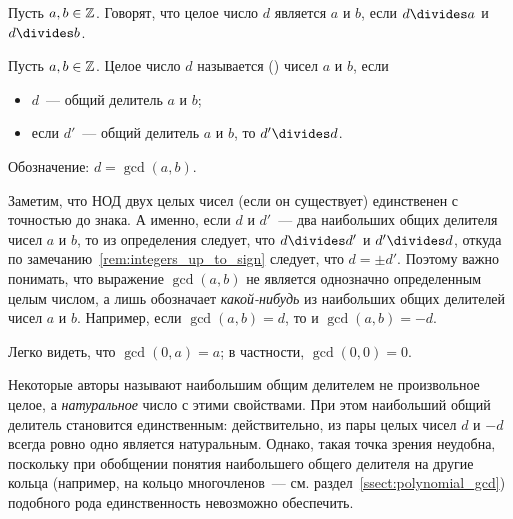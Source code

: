 
\begin{definition}
Пусть $a,b\in\mathbb Z$. Говорят, что целое число $d$ является  $a$ и $b$, если $d\divides a$ и
$d\divides b$.
\end{definition}
\begin{definition}
Пусть $a,b\in\mathbb Z$. Целое число $d$ называется
 ()
чисел $a$ и $b$, если
\begin{itemize}
\item $d$~--- общий делитель $a$ и $b$;
\item если $d'$~--- общий делитель $a$ и $b$, то $d'\divides d$.
\end{itemize}
Обозначение: $d=\gcd(a,b)$.
\end{definition}

Заметим, что НОД двух целых чисел (если он существует) единственен с
точностью до знака. А именно, если $d$ и
$d'$~--- два наибольших общих делителя чисел $a$ и $b$,
то из определения
следует, что $d\divides d'$ и $d'\divides d$, откуда по
замечанию~\ref{rem:integers_up_to_sign} следует, что $d=\pm d'$.
Поэтому важно понимать, что выражение $\gcd(a,b)$ не является
однозначно определенным целым числом, а лишь обозначает
{\em какой-нибудь} из наибольших общих делителей чисел $a$ и
$b$. Например, если $\gcd(a,b)=d$, то и $\gcd(a,b)=-d$.

Легко видеть, что $\gcd(0,a)=a$; в частности,
$\gcd(0,0)=0$.

{\small
Некоторые авторы называют наибольшим общим делителем не произвольное
целое, а {\it натуральное} число с этими свойствами. При этом
наибольший общий
делитель становится единственным: действительно, из пары целых чисел
$d$ и $-d$ всегда ровно одно является натуральным.
Однако, такая точка зрения неудобна, поскольку при обобщении понятия
наибольшего общего делителя на другие кольца (например, на кольцо
многочленов~--- см. раздел~\ref{ssect:polynomial_gcd}) подобного рода
единственность невозможно обеспечить.}

